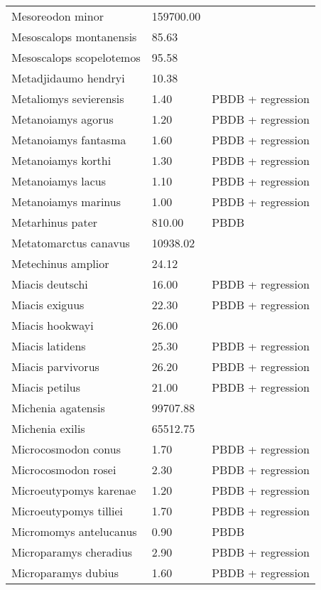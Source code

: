 \documentclass{article}
\begin{document}
\begin{center}
\begin{longtable}{p{} p{} p{}}
    Mesoreodon minor & 159700.00 & \cite{McKenna2011} \\ 
    Mesoscalops montanensis & 85.63 & \cite{Tomiya2013} \\ 
    Mesoscalops scopelotemos & 95.58 & \cite{Tomiya2013} \\ 
    Metadjidaumo hendryi & 10.38 & \cite{Tomiya2013} \\ 
    Metaliomys sevierensis & 1.40 & PBDB + regression \\ 
    Metanoiamys agorus & 1.20 & PBDB + regression \\ 
    Metanoiamys fantasma & 1.60 & PBDB + regression \\ 
    Metanoiamys korthi & 1.30 & PBDB + regression \\ 
    Metanoiamys lacus & 1.10 & PBDB + regression \\ 
    Metanoiamys marinus & 1.00 & PBDB + regression \\ 
    Metarhinus pater & 810.00 & PBDB \\ 
    Metatomarctus canavus & 10938.02 & \cite{Tomiya2013} \\ 
    Metechinus amplior & 24.12 & \cite{Tedford1994} \\ 
    Miacis deutschi & 16.00 & PBDB + regression \\ 
    Miacis exiguus & 22.30 & PBDB + regression \\ 
    Miacis hookwayi & 26.00 & \cite{Patton1973} \\ 
    Miacis latidens & 25.30 & PBDB + regression \\ 
    Miacis parvivorus & 26.20 & PBDB + regression \\ 
    Miacis petilus & 21.00 & PBDB + regression \\ 
    Michenia agatensis & 99707.88 & \cite{Tomiya2013} \\ 
    Michenia exilis & 65512.75 & \cite{Tomiya2013} \\ 
    Microcosmodon conus & 1.70 & PBDB + regression \\ 
    Microcosmodon rosei & 2.30 & PBDB + regression \\ 
    Microeutypomys karenae & 1.20 & PBDB + regression \\ 
    Microeutypomys tilliei & 1.70 & PBDB + regression \\ 
    Micromomys antelucanus & 0.90 & PBDB \\ 
    Microparamys cheradius & 2.90 & PBDB + regression \\ 
    Microparamys dubius & 1.60 & PBDB + regression \\ 

\end{longtable}
\end{center}
\end{document}
